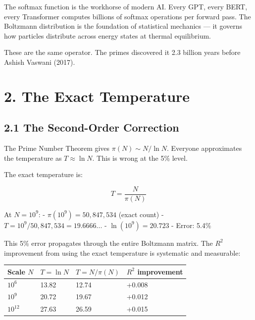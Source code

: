 \documentclass[
  11pt,
]{article}
\newcounter{none} %
\numberwithin{equation}{section}
\begin{document}
The softmax function is the workhorse of modern AI. Every GPT, every
BERT, every Transformer computes billions of softmax operations per
forward pass. The Boltzmann distribution is the foundation of
statistical mechanics --- it governs how particles distribute across
energy states at thermal equilibrium.

These are the same operator. The primes discovered it 2.3 billion years
before Ashish Vaswani (2017).



\setcounter{section}{2}\setcounter{equation}{0}
\setcounter{section}{2}\setcounter{equation}{0}
\section{2. The Exact Temperature}\label{the-exact-temperature}

\subsection{2.1 The Second-Order
Correction}\label{the-second-order-correction}

The Prime Number Theorem gives \(\pi(N) \sim N/\ln N\). Everyone
approximates the temperature as \(T \approx \ln N\). This is wrong at
the 5\% level.

The exact temperature is:

\begin{equation}T = \frac{N}{\pi(N)}\end{equation}

At \(N = 10^9\): - \(\pi(10^9) = 50,847,534\) (exact count) -
\(T = 10^9 / 50,847,534 = 19.6666...\) - \(\ln(10^9) = 20.723\) - Error:
5.4\%

This 5\% error propagates through the entire Boltzmann matrix. The
\(R^2\) improvement from using the exact temperature is systematic and
measurable:

{\def\LTcaptype{none} %
\begin{longtable}[]{@{}llll@{}}
\toprule\noalign{}
Scale \(N\) & \(T = \ln N\) & \(T = N/\pi(N)\) & \(R^2\) improvement \\
\midrule\noalign{}
\endhead
\bottomrule\noalign{}
\endlastfoot
\(10^6\) & 13.82 & 12.74 & +0.008 \\
\(10^9\) & 20.72 & 19.67 & +0.012 \\
\(10^{12}\) & 27.63 & 26.59 & +0.015 \\
\end{longtable}
}
\end{document}
